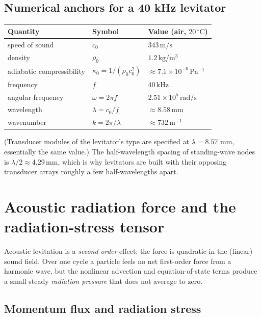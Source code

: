 \documentclass[11pt]{article}
\newcommand{\rrho}{\rho_{0}}
\newcommand{\cc}{c_{0}}
\newcommand{\kkz}{\kappa_{0}}
\begin{document}
\subsection{Numerical anchors for a 40 kHz levitator}
\begin{center}
\begin{tabular}{lll}
\hline
Quantity & Symbol & Value (air, $20\,^{\circ}\mathrm{C}$)\\
\hline
speed of sound & $\cc$ & $343\,\mathrm{m/s}$\\
density & $\rrho$ & $1.2\,\mathrm{kg/m^{3}}$\\
adiabatic compressibility & $\kkz=1/(\rrho\cc^{2})$ & $\approx 7.1\times10^{-6}\,\mathrm{Pa^{-1}}$\\
frequency & $f$ & $40\,\mathrm{kHz}$\\
angular frequency & $\omega=2\pi f$ & $2.51\times10^{5}\,\mathrm{rad/s}$\\
wavelength & $\lambda=\cc/f$ & $\approx 8.58\,\mathrm{mm}$\\
wavenumber & $k=2\pi/\lambda$ & $\approx 732\,\mathrm{m^{-1}}$\\
\hline
\end{tabular}
\end{center}
(Transducer modules of the levitator's type are specified at $\lambda=8.57$
mm, essentially the same value.) The half-wavelength spacing of standing-wave
nodes is $\lambda/2\approx 4.29\,\mathrm{mm}$, which is why levitators are built
with their opposing transducer arrays roughly a few half-wavelengths apart.

\section{Acoustic radiation force and the radiation-stress tensor}
\label{sec:radiation}

Acoustic levitation is a \emph{second-order} effect: the force is quadratic in
the (linear) sound field. Over one cycle a particle feels no net first-order
force from a harmonic wave, but the nonlinear advection and equation-of-state
terms produce a small steady \emph{radiation pressure} that does not average to
zero.

\subsection{Momentum flux and radiation stress}
\end{document}
